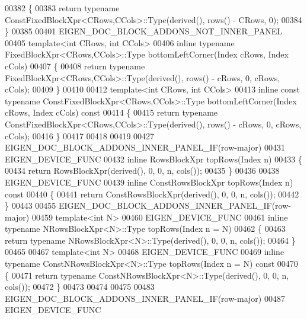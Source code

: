 \begin{DoxyCode}
00382 \textcolor{keyword}{}\{
00383   \textcolor{keywordflow}{return} \textcolor{keyword}{typename} ConstFixedBlockXpr<CRows,CCols>::Type(derived(), rows() - CRows, 0);
00384 \}
00385 
00401 EIGEN\_DOC\_BLOCK\_ADDONS\_NOT\_INNER\_PANEL
00405 \textcolor{keyword}{template}<\textcolor{keywordtype}{int} CRows, \textcolor{keywordtype}{int} CCols>
00406 \textcolor{keyword}{inline} \textcolor{keyword}{typename} FixedBlockXpr<CRows,CCols>::Type bottomLeftCorner(Index cRows, Index cCols)
00407 \{
00408   \textcolor{keywordflow}{return} \textcolor{keyword}{typename} FixedBlockXpr<CRows,CCols>::Type(derived(), rows() - cRows, 0, cRows, cCols);
00409 \}
00410 
00412 \textcolor{keyword}{template}<\textcolor{keywordtype}{int} CRows, \textcolor{keywordtype}{int} CCols>
00413 \textcolor{keyword}{inline} \textcolor{keyword}{const} \textcolor{keyword}{typename} ConstFixedBlockXpr<CRows,CCols>::Type bottomLeftCorner(Index cRows, Index cCols)\textcolor{keyword}{
       const}
00414 \textcolor{keyword}{}\{
00415   \textcolor{keywordflow}{return} \textcolor{keyword}{typename} ConstFixedBlockXpr<CRows,CCols>::Type(derived(), rows() - cRows, 0, cRows, cCols);
00416 \}
00417 
00418 
00419 
00427 EIGEN\_DOC\_BLOCK\_ADDONS\_INNER\_PANEL\_IF(row-major)
00431 EIGEN\_DEVICE\_FUNC
00432 \textcolor{keyword}{inline} RowsBlockXpr topRows(Index n)
00433 \{
00434   \textcolor{keywordflow}{return} RowsBlockXpr(derived(), 0, 0, n, cols());
00435 \}
00436 
00438 EIGEN\_DEVICE\_FUNC
00439 \textcolor{keyword}{inline} ConstRowsBlockXpr topRows(Index n)\textcolor{keyword}{ const}
00440 \textcolor{keyword}{}\{
00441   \textcolor{keywordflow}{return} ConstRowsBlockXpr(derived(), 0, 0, n, cols());
00442 \}
00443 
00455 EIGEN\_DOC\_BLOCK\_ADDONS\_INNER\_PANEL\_IF(row-major)
00459 \textcolor{keyword}{template}<\textcolor{keywordtype}{int} N>
00460 EIGEN\_DEVICE\_FUNC
00461 \textcolor{keyword}{inline} \textcolor{keyword}{typename} NRowsBlockXpr<N>::Type topRows(Index n = N)
00462 \{
00463   \textcolor{keywordflow}{return} \textcolor{keyword}{typename} NRowsBlockXpr<N>::Type(derived(), 0, 0, n, cols());
00464 \}
00465 
00467 \textcolor{keyword}{template}<\textcolor{keywordtype}{int} N>
00468 EIGEN\_DEVICE\_FUNC
00469 \textcolor{keyword}{inline} \textcolor{keyword}{typename} ConstNRowsBlockXpr<N>::Type topRows(Index n = N)\textcolor{keyword}{ const}
00470 \textcolor{keyword}{}\{
00471   \textcolor{keywordflow}{return} \textcolor{keyword}{typename} ConstNRowsBlockXpr<N>::Type(derived(), 0, 0, n, cols());
00472 \}
00473 
00474 
00475 
00483 EIGEN\_DOC\_BLOCK\_ADDONS\_INNER\_PANEL\_IF(row-major)
00487 EIGEN\_DEVICE\_FUNC

\end{DoxyCode}
